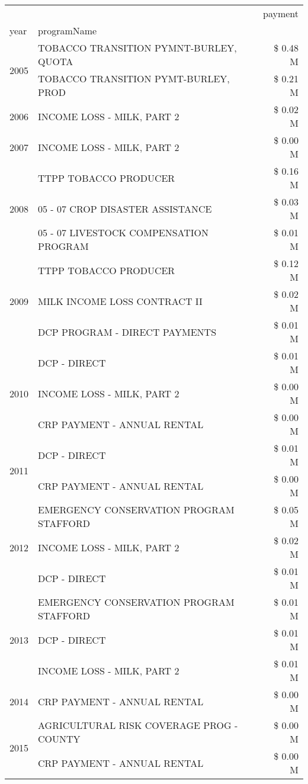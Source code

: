 \begin{tabular}{llr}
\toprule
 &  & payment \\
year & programName &  \\
\midrule
\multirow[t]{2}{*}{2005} & TOBACCO TRANSITION PYMNT-BURLEY, QUOTA & \$ 0.48 M \\
 & TOBACCO TRANSITION PYMT-BURLEY, PROD & \$ 0.21 M \\
\cline{1-3}
2006 & INCOME LOSS - MILK, PART 2 & \$ 0.02 M \\
\cline{1-3}
2007 & INCOME LOSS - MILK, PART 2 & \$ 0.00 M \\
\cline{1-3}
\multirow[t]{3}{*}{2008} & TTPP TOBACCO PRODUCER & \$ 0.16 M \\
 & 05 - 07 CROP DISASTER ASSISTANCE & \$ 0.03 M \\
 & 05 - 07 LIVESTOCK COMPENSATION PROGRAM & \$ 0.01 M \\
\cline{1-3}
\multirow[t]{3}{*}{2009} & TTPP TOBACCO PRODUCER & \$ 0.12 M \\
 & MILK INCOME LOSS CONTRACT II & \$ 0.02 M \\
 & DCP PROGRAM - DIRECT PAYMENTS & \$ 0.01 M \\
\cline{1-3}
\multirow[t]{3}{*}{2010} & DCP - DIRECT & \$ 0.01 M \\
 & INCOME LOSS - MILK, PART 2 & \$ 0.00 M \\
 & CRP PAYMENT - ANNUAL RENTAL & \$ 0.00 M \\
\cline{1-3}
\multirow[t]{2}{*}{2011} & DCP - DIRECT & \$ 0.01 M \\
 & CRP PAYMENT - ANNUAL RENTAL & \$ 0.00 M \\
\cline{1-3}
\multirow[t]{3}{*}{2012} & EMERGENCY CONSERVATION PROGRAM STAFFORD & \$ 0.05 M \\
 & INCOME LOSS - MILK, PART 2 & \$ 0.02 M \\
 & DCP - DIRECT & \$ 0.01 M \\
\cline{1-3}
\multirow[t]{3}{*}{2013} & EMERGENCY CONSERVATION PROGRAM STAFFORD & \$ 0.01 M \\
 & DCP - DIRECT & \$ 0.01 M \\
 & INCOME LOSS - MILK, PART 2 & \$ 0.01 M \\
\cline{1-3}
2014 & CRP PAYMENT - ANNUAL RENTAL & \$ 0.00 M \\
\cline{1-3}
\multirow[t]{2}{*}{2015} & AGRICULTURAL RISK COVERAGE PROG - COUNTY & \$ 0.00 M \\
 & CRP PAYMENT - ANNUAL RENTAL & \$ 0.00 M \\
\cline{1-3}

\end{tabular}
